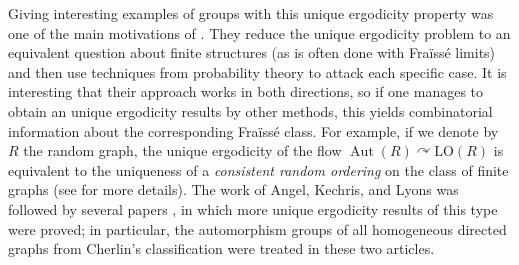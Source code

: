 \documentclass[JEP,XML,SOM,Unicode,published]{cedram}
\let\actson\curvearrowright
\theoremstyle{plain}
\theoremstyle{definition}
\DeclareMathOperator{\Aut}{Aut}
\newcommand{\LO}{\mathrm{LO}}
\begin{document}
Giving interesting examples of groups with this unique ergodicity property was one of the main motivations of \cite{Angel2014}. They reduce the unique ergodicity problem to an equivalent question about finite structures (as is often done with Fraïssé limits) and then use techniques from probability theory to attack each specific case. It is interesting that their approach works in both directions, so if one manages to obtain an unique ergodicity results by other methods, this yields combinatorial information about the corresponding Fraïssé class. For example, if we denote by $R$ the random graph, the unique ergodicity of the flow $\Aut(R) \actson \LO(R)$ is equivalent to the uniqueness of a \emph{consistent random ordering} on the class of finite graphs (see \cite{Angel2014} for more details). The work of Angel, Kechris, and Lyons was followed by several papers \cite{Pawliuk2020, Jahel2019p}, in which more unique ergodicity results of this type were proved; in particular, the automorphism groups of all homogeneous directed graphs from Cherlin's classification were treated in these two articles.
\end{document}

